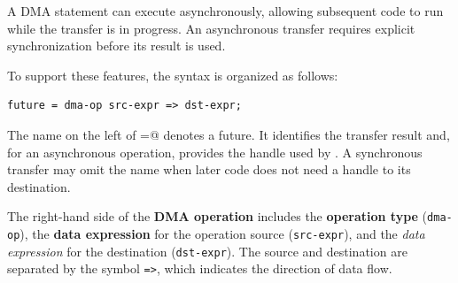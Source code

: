A DMA statement can execute asynchronously, allowing subsequent code to run while the transfer is in progress. An asynchronous transfer requires explicit synchronization before its result is used.

To support these features, the syntax is organized as follows:

\begin{lstlisting}[language=croqtile,caption={Basic Syntax}]
future = dma-op src-expr => dst-expr;
\end{lstlisting}

The name on the left of \co@=@ denotes a future. It identifies the transfer result and, for an asynchronous operation, provides the handle used by \co@wait@. A synchronous transfer may omit the name when later code does not need a handle to its destination.

The right-hand side of the \textbf{DMA operation} includes the \textbf{operation type} (\texttt{dma-op}), the \textbf{data expression} for the operation source (\texttt{src-expr}), and the \emph{data expression} for the destination (\texttt{dst-expr}). The source and destination are separated by the symbol \texttt{=\textgreater{}}, which indicates the direction of data flow.
